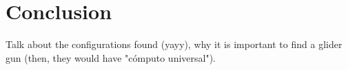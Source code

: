 
\section{Conclusion}
Talk about the configurations found (yayy), why it is important to find a
glider gun (then, they would have "cómputo universal"). 
